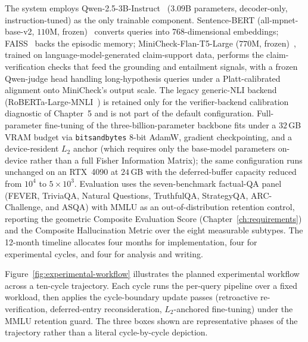 The system employs Qwen-2.5-3B-Instruct~\cite{qwen25} ($3.09$B parameters, decoder-only, instruction-tuned) as the only trainable component. Sentence-BERT (all-mpnet-base-v2, $110$M, frozen)~\cite{reimers-gurevych-2019-sentence} converts queries into 768-dimensional embeddings; FAISS~\cite{8733051} backs the episodic memory; MiniCheck-Flan-T5-Large ($770$M, frozen)~\cite{tang2024minicheck}, trained on language-model-generated claim-support data, performs the claim-verification checks that feed the grounding and entailment signals, with a frozen Qwen-judge head handling long-hypothesis queries under a Platt-calibrated alignment onto MiniCheck's output scale. The legacy generic-NLI backend (RoBERTa-Large-MNLI~\cite{liu2019roberta}) is retained only for the verifier-backend calibration diagnostic of Chapter~5 and is not part of the default configuration. Full-parameter fine-tuning of the three-billion-parameter backbone fits under a $32$\,GB VRAM budget via \texttt{bitsandbytes} 8-bit AdamW, gradient checkpointing, and a device-resident $L_{2}$ anchor (which requires only the base-model parameters on-device rather than a full Fisher Information Matrix); the same configuration runs unchanged on an RTX~4090 at $24$\,GB with the deferred-buffer capacity reduced from $10^{4}$ to $5 \times 10^{3}$. Evaluation uses the seven-benchmark factual-QA panel (FEVER, TriviaQA, Natural Questions, TruthfulQA, StrategyQA, ARC-Challenge, and ASQA) with MMLU as an out-of-distribution retention control, reporting the geometric Composite Evaluation Score (Chapter~\ref{ch:requirements}) and the Composite Hallucination Metric over the eight measurable subtypes. The 12-month timeline allocates four months for implementation, four for experimental cycles, and four for analysis and writing.

Figure~\ref{fig:experimental-workflow} illustrates the planned experimental workflow across a ten-cycle trajectory. Each cycle runs the per-query pipeline over a fixed workload, then applies the cycle-boundary update passes (retroactive re-verification, deferred-entry reconsideration, $L_2$-anchored fine-tuning) under the MMLU retention guard. The three boxes shown are representative phases of the trajectory rather than a literal cycle-by-cycle depiction.

